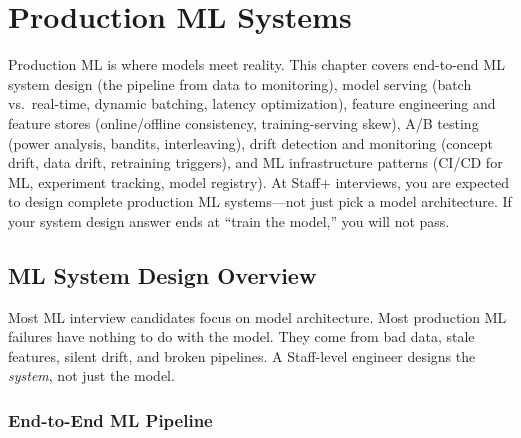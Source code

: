 \chapter{Production ML Systems}
\label{chap:production_systems}

\begin{tldr}
Production ML is where models meet reality. This chapter covers end-to-end ML system design (the pipeline from data to monitoring), model serving (batch vs.\ real-time, dynamic batching, latency optimization), feature engineering and feature stores (online/offline consistency, training-serving skew), A/B testing (power analysis, bandits, interleaving), drift detection and monitoring (concept drift, data drift, retraining triggers), and ML infrastructure patterns (CI/CD for ML, experiment tracking, model registry). At Staff+ interviews, you are expected to design complete production ML systems---not just pick a model architecture. If your system design answer ends at ``train the model,'' you will not pass.
\end{tldr}

\section{ML System Design Overview}
\label{sec:ml_system_overview}

Most ML interview candidates focus on model architecture. Most production ML failures have nothing to do with the model. They come from bad data, stale features, silent drift, and broken pipelines. A Staff-level engineer designs the \textit{system}, not just the model.

\subsection{End-to-End ML Pipeline}

